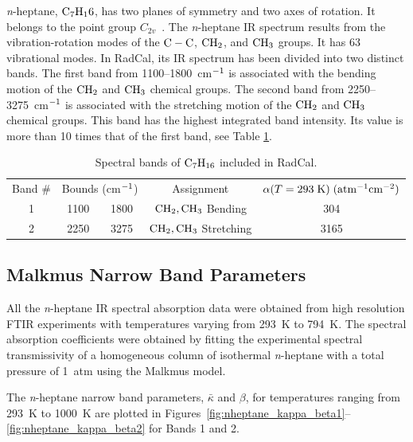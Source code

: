\textit{n}-heptane, $\rm C_7H_16$, has two planes of symmetry and two axes of rotation. It belongs to the point group $C_{2v}$~\cite{Herzberg1949}. The \textit{n}-heptane IR spectrum results from the vibration-rotation modes of the $\rm C-C$, $\rm CH_2$, and $\rm CH_3$ groups. It has 63 vibrational modes. In RadCal, its IR spectrum has been divided into two distinct bands. The first band from 1100--1800~cm$\rm^{-1}$ is associated with the bending motion of the $\rm CH_2$ and $\rm CH_3$ chemical groups. The second band from 2250--3275~cm$\rm^{-1}$ is associated with the stretching motion of the $\rm CH_2$ and $\rm CH_3$ chemical groups. This band has the highest integrated band intensity. Its value is more than 10 times that of the first band, see Table \ref{Table::C7H16}.
\begin{table}[ht]
   \centering
   \caption{Spectral bands of $\rm C_7H_{16}$ included in RadCal.}
   \vspace{0.1in}
   \label{Table::C7H16}
   \begin{tabular}{|c|c|c|c|c|}
    \hline
    Band \# & \multicolumn{2}{|l|}{Bounds (cm$\rm ^{-1}$) } & Assignment & $\alpha(T=293 \; {\rm K}) \; (\rm {atm^{-1} cm^{-2}})$\\
    \cline{1-5}
    1 & 1100  & 1800 &  $\rm CH_2, CH_3$ Bending    & 304 \\
    2 & 2250  & 3275 &  $\rm CH_2, CH_3$ Stretching & 3165 \\
    \hline
   \end{tabular}
\end{table}

\subsection{Malkmus Narrow Band Parameters}

All the \textit{n}-heptane IR spectral absorption data were obtained from high resolution FTIR experiments with temperatures varying from 293~K to 794~K. The spectral absorption coefficients were obtained by fitting the experimental spectral transmissivity of a homogeneous column of isothermal \textit{n}-heptane with a total pressure of 1~atm using the Malkmus model.

The \textit{n}-heptane narrow band parameters, $\bar{\kappa}$ and $\beta$, for temperatures ranging from 293~K to 1000~K are plotted in Figures~\ref{fig:nheptane_kappa_beta1}--\ref{fig:nheptane_kappa_beta2} for Bands 1 and 2.

\newpage

